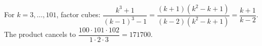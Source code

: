 For $k=3,\ldots,101$, factor cubes: $\dfrac{k^3+1}{(k-1)^3-1}=\dfrac{(k+1)(k^2-k+1)}{(k-2)(k^2-k+1)}=\dfrac{k+1}{k-2}$. The product cancels to $\dfrac{100\cdot101\cdot102}{1\cdot2\cdot3}=\boxed{171700}$.
